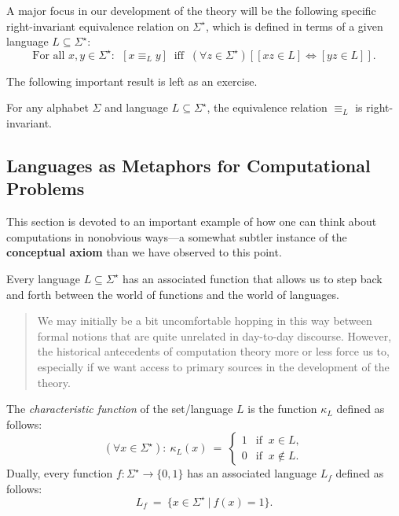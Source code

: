 \documentclass{article}
\begin{document}
{A major focus in our development of the theory will be the following
specific right-invariant equivalence relation on $\Sigma^\star$, which
is defined in terms of a given language $L \subseteq \Sigma^\star$:
\begin{equation}
\label{e.equiv-sub-L}
\mbox{For all } x, y \in \Sigma^\star: \ \
[x \equiv_L y] \ \mbox{ iff } \ (\forall z \in \Sigma^\star) [ [xz
    \in L] \Leftrightarrow [yz \in L] ].
\end{equation}

The following important result is left as an exercise.

\begin{lemma}
\label{l.equiv-sub-L}
For any alphabet $\Sigma$ and language $L \subseteq \Sigma^\star$, the
equivalence relation $\equiv_L$ is right-invariant.
\end{lemma}

\subsection{Languages as Metaphors for Computational Problems}
\label{s.language-metaphor}

This section is devoted to an important example of how one can think
about computations in nonobvious ways---a somewhat subtler instance of
the {\bf conceptual axiom}\index{conceptual axiom}
than we have observed to this point.

Every language $L \subseteq \Sigma^\star$ has an associated function
that allows us to step back and forth between the world of functions
and the world of languages.
\begin{quote}
We may initially be a bit uncomfortable hopping in this way between
formal notions that are quite unrelated in day-to-day discourse.
However, the historical antecedents of computation theory more or less
force us to, especially if we want access to primary sources in the
development of the theory.
\end{quote}

The {\it characteristic function}
of the set/language $L$ is the function 
$\kappa_L$
defined as follows:
\[ (\forall x \in \Sigma^\star): \  \kappa_L(x) \ = \ \left\{
\begin{array}{ll}
1 & \mbox{if } \ x \in L, \\
0 & \mbox{if } \ x \not\in L.
\end{array} \right.
\]
Dually, every function $f: \Sigma^\star \rightarrow \{ 0,1 \}$ has an
associated language $L_f$ defined as follows:
\[ L_f \ = \ \{ x \in \Sigma^\star \ | \ f(x) = 1 \}. \]

}
\end{document}
